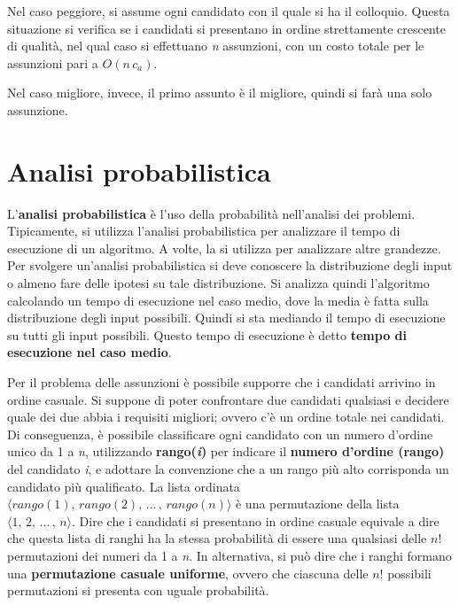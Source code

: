 \documentclass[10pt, a4paper]{report}
\begin{document}
Nel caso peggiore, si assume ogni candidato con il quale si ha il colloquio. Questa situazione si verifica se i candidati si presentano in ordine strettamente crescente di qualità, nel qual caso si effettuano \textit{n} assunzioni, con un costo totale per le assunzioni pari a $O(n\,c_a)$.

Nel caso migliore, invece, il primo assunto è il migliore, quindi si farà una solo assunzione.
\section{Analisi probabilistica}
L'\textbf{analisi probabilistica} è l'uso della probabilità nell'analisi dei problemi. Tipicamente, si utilizza l'analisi probabilistica per analizzare il tempo di esecuzione di un algoritmo. A volte, la si utilizza per analizzare altre grandezze. Per svolgere un'analisi probabilistica si deve conoscere la distribuzione degli input o almeno fare delle ipotesi su tale distribuzione. Si analizza quindi l'algoritmo calcolando un tempo di esecuzione nel caso medio, dove la media è fatta sulla distribuzione degli input possibili. Quindi si sta mediando il tempo di esecuzione su tutti gli input possibili. Questo tempo di esecuzione è detto \textbf{tempo di esecuzione nel caso medio}.

Per il problema delle assunzioni è possibile supporre che i candidati arrivino in ordine casuale. Si suppone di poter confrontare due candidati qualsiasi e decidere quale dei due abbia i requisiti migliori; ovvero c'è un ordine totale nei candidati. Di conseguenza, è possibile classificare ogni candidato con un numero d'ordine unico da 1 a \textit{n}, utilizzando \textbf{rango(\textit{i})} per indicare il \textbf{numero d'ordine (rango)} del candidato \textit{i}, e adottare la convenzione che a un rango più alto corrisponda un candidato più qualificato. La lista ordinata $\langle rango(1),\,rango(2),\,...\,,\,rango(n)\rangle$ è una permutazione della lista $\langle 1,\,2,\,...\,,\,n\rangle$. Dire che i candidati si presentano in ordine casuale equivale a dire che questa lista di ranghi ha la stessa probabilità di essere una qualsiasi delle $n!$ permutazioni dei numeri da 1 a \textit{n}. In alternativa, si può dire che i ranghi formano una \textbf{permutazione casuale uniforme}, ovvero che ciascuna delle $n!$ possibili permutazioni si presenta con uguale probabilità.
\end{document}
